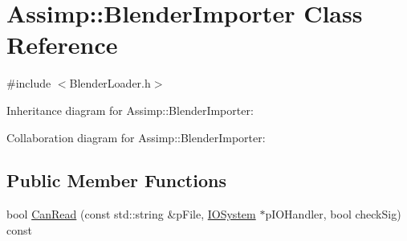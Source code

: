 \hypertarget{class_assimp_1_1_blender_importer}{\section{Assimp\+:\+:Blender\+Importer Class Reference}
\label{class_assimp_1_1_blender_importer}
}


{\ttfamily \#include $<$Blender\+Loader.\+h$>$}



Inheritance diagram for Assimp\+:\+:Blender\+Importer\+:


Collaboration diagram for Assimp\+:\+:Blender\+Importer\+:
\subsection*{Public Member Functions}
\begin{DoxyCompactItemize}
\item 
bool \hyperlink{class_assimp_1_1_blender_importer_a19f3c32d62f8047c48ea1c5453e0b295}{Can\+Read} (const std\+::string \&p\+File, \hyperlink{class_assimp_1_1_i_o_system}{I\+O\+System} $\ast$p\+I\+O\+Handler, bool check\+Sig) const 
\end{DoxyCompactItemize}
